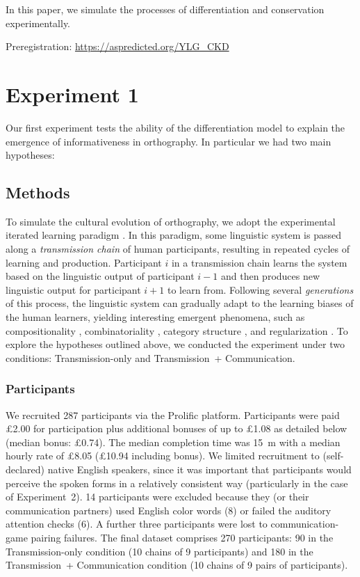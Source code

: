 \documentclass[doc,biblatex]{apa7}
\begin{document}
In this paper, we simulate the processes of differentiation and conservation experimentally.

Preregistration: \url{https://aspredicted.org/YLG_CKD}


\section{Experiment 1}

Our first experiment tests the ability of the differentiation model to explain the emergence of informativeness in orthography. In particular we had two main hypotheses:

\subsection{Methods}

To simulate the cultural evolution of orthography, we adopt the experimental iterated learning paradigm \parencite{Kirby:2008, Kirby:2015}. In this paradigm, some linguistic system is passed along a \textit{transmission chain} of human participants, resulting in repeated cycles of learning and production. Participant $i$ in a transmission chain learns the system based on the linguistic output of participant $i-1$ and then produces new linguistic output for participant $i+1$ to learn from. Following several \textit{generations} of this process, the linguistic system can gradually adapt to the learning biases of the human learners, yielding interesting emergent phenomena, such as compositionality \parencite{Kirby:2008, Kirby:2015}, combinatoriality \parencite{Verhoef:2015}, category structure \parencite{Carr:2017, Carr:2020}, and regularization \parencite{Smith:2010, Ferdinand:2019}. To explore the hypotheses outlined above, we conducted the experiment under two conditions: Transmission-only and Transmission~+ Communication.

\subsubsection{Participants}

We recruited 287 participants via the Prolific platform. Participants were paid £2.00 for participation plus additional bonuses of up to £1.08 as detailed below (median bonus: £0.74). The median completion time was 15~m with a median hourly rate of £8.05 (£10.94 including bonus). We limited recruitment to (self-declared) native English speakers, since it was important that participants would perceive the spoken forms in a relatively consistent way (particularly in the case of Experiment~2). 14 participants were excluded because they (or their communication partners) used English color words (8) or failed the auditory attention checks (6). A further three participants were lost to communication-game pairing failures. The final dataset comprises 270 participants: 90 in the Transmission-only condition (10 chains of 9 participants) and 180 in the Transmission~+ Communication condition (10 chains of 9 pairs of participants).
\end{document}
